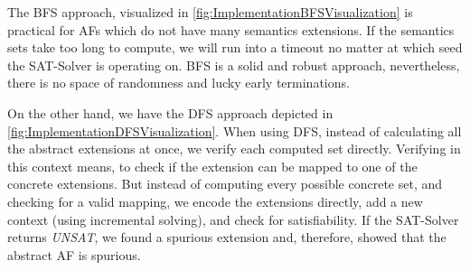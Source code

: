 The BFS approach, visualized in \cref{fig:ImplementationBFSVisualization} is practical for AFs which do not have many semantics extensions. If the semantics sets take too long to compute, we will run into a timeout no matter at which seed the SAT-Solver is operating on. BFS is a solid and robust approach, nevertheless, there is no space of randomness and lucky early terminations.

On the other hand, we have the DFS approach depicted in \cref{fig:ImplementationDFSVisualization}. When using DFS, instead of calculating all the abstract extensions at once, we verify each computed set directly. Verifying in this context means, to check if the extension can be mapped to one of the concrete extensions. But instead of computing every possible concrete set, and checking for a valid mapping, we encode the extensions directly, add a new context (using incremental solving), and check for satisfiability. If the SAT-Solver returns \emph{UNSAT}, we found a spurious extension and, therefore, showed that the abstract AF is spurious.


